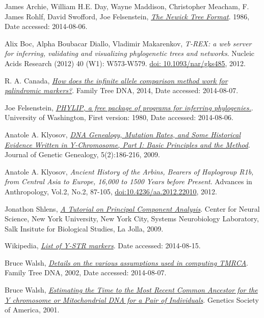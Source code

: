 \raggedright
\begin{thebibliography}{bla}


 James Archie, William H.E. Day, Wayne Maddison,
Christopher Meacham, F. James Rohlf, David Swofford, Joe Felsenstein,
\emph{\href{http://evolution.genetics.washington.edu/phylip/newicktree.html}
{The Newick Tree Format}}.
1986, Date accessed: 2014-08-06.

 Alix Boc, Alpha Boubacar Diallo, Vladimir Makarenkov,
\emph{T-REX: a web server for inferring, validating and
visualizing phylogenetic trees and networks}.
Nucleic Acids Research (2012) 40 (W1): W573-W579.
\href{http://dx.doi.org/10.1093/nar/gks485}{doi: 10.1093/nar/gks485}, 2012. 

 R. A. Canada,
\emph{\href{https://www.familytreedna.com/learn/y-dna-testing/y-str/infinite-allele-palindromic-markers/}
{How does the infinite allele comparison method work for palindromic markers?}}.
Family Tree DNA, 2014, Date accessed: 2014-08-07.

 Joe Felsenstein,
\emph{\href{http://evolution.genetics.washington.edu/phylip.html}
{PHYLIP, a free package of programs for inferring phylogenies.}}.
University of Washington, First version: 1980, Date accessed: 2014-08-06.

 Anatole A. Klyosov,
\emph{\href{http://www.jogg.info/52/files/Klyosov1.pdf}
{DNA Genealogy, Mutation Rates, and Some Historical
Evidence Written in Y-Chromosome, Part I:  Basic Principles and
the Method}}.
Journal of Genetic Genealogy, 5(2):186-216, 2009.

 Anatole A. Klyosov,
\emph{Ancient History of the Arbins, Bearers of Haplogroup R1b, from
Central Asia to Europe, 16,000 to 1500 Years before Present}.
Advances in Anthropology, Vol.2, No.2, 87-105,
\href{http://dx.doi.org/10.4236/aa.2012.22010}{doi:10.4236/aa.2012.22010}, 2012.

 Jonathon Shlens,
\emph{\href{http://rieke-server.physiol.washington.edu/People/Fred/Classes/545/shlens-pca.pdf}
{A Tutorial on Principal Component Analysis}}.
Center for Neural Science, New York University,
New York City, 
Systems Neurobiology Laboratory, Salk Insitute for Biological Studies,
La Jolla, 2009.

 Wikipedia,
\emph{\href{http://en.wikipedia.org/wiki/List_of_DYS_markers}
{List of Y-STR markers}}.
Date accessed: 2014-08-15.

 Bruce Walsh,
\emph{\href{http://nitro.biosci.arizona.edu/ftDNA/models.html}
{Details on the various assumptions used in computing TMRCA}}.
Family Tree DNA, 2002, Date accessed: 2014-08-07.

 Bruce Walsh,
\emph{\href{http://www.ncbi.nlm.nih.gov/pmc/articles/PMC1461668/}
{Estimating the Time to the Most Recent Common Ancestor for the
Y chromosome or Mitochondrial DNA for a Pair of Individuals}}.
Genetics Society of America, 2001.

\end{thebibliography}
